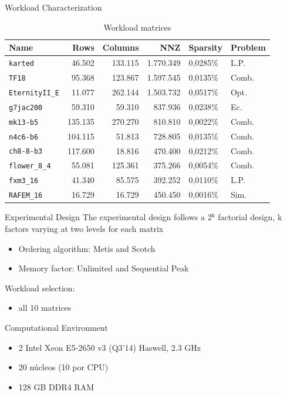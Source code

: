 \documentclass[presentation]{beamer}
\begin{document}
\begin{frame}[fragile,label={sec:orge4472a8}]{Workload Characterization}
 \newcommand{\ct}[1]{}
\setlength{\tabcolsep}{3pt}
\begin{table}[!h]
\caption{\label{tab:org3534e7a}
Workload matrices}
\centering
\begin{tabular}{lrrrll}
\hline
Name & Rows & Columns & NNZ & Sparsity & Problem\\
\hline
\texttt{karted} & 46.502 & 133.115 & 1.770.349 & 0,0285\% & L.P.\\
\texttt{TF18} & 95.368 & 123.867 & 1.597.545 & 0,0135\% & Comb.\\
\texttt{EternityII\_E} & 11.077 & 262.144 & 1.503.732 & 0,0517\% & Opt.\\
\hline
\texttt{g7jac200} & 59.310 & 59.310 & 837.936 & 0,0238\% & Ec.\\
\texttt{mk13-b5} & 135.135 & 270.270 & 810.810 & 0,0022\% & Comb.\\
\texttt{n4c6-b6} & 104.115 & 51.813 & 728.805 & 0,0135\% & Comb.\\
\hline
\texttt{ch8-8-b3} & 117.600 & 18.816 & 470.400 & 0,0212\% & Comb.\\
\texttt{flower\_8\_4} & 55.081 & 125.361 & 375.266 & 0,0054\% & Comb.\\
\texttt{fxm3\_16} & 41.340 & 85.575 & 392.252 & 0,0110\% & L.P.\\
\texttt{RAFEM\_16} & 16.729 & 16.729 & 450.450 & 0,0016\% & Sim.\\
\hline
\end{tabular}
\end{table}
\end{frame}

\begin{frame}[label={sec:orgee2da1f}]{Experimental Design}
\vfill
The experimental design follows a \alert{2\(^{\text{k}}\)} factorial design, \alert{k factors}
varying at \alert{two levels} for each matrix  
\begin{itemize}
\item Ordering algorithm: \alert{Metis} and \alert{Scotch}
\item Memory factor: \alert{Unlimited} and \alert{Sequential Peak}
\end{itemize}
\vfill
Workload selection:
\begin{itemize}
\item all 10 matrices
\end{itemize}
\vfill
Computational Environment
\begin{itemize}
\item 2 \texttimes{} Intel Xeon E5-2650 v3 (Q3'14) Haswell, 2.3 GHz
\item 20 núcleos (10 por CPU)
\item 128 GB DDR4 RAM
\end{itemize}
\vfill
\end{frame}
\end{document}
